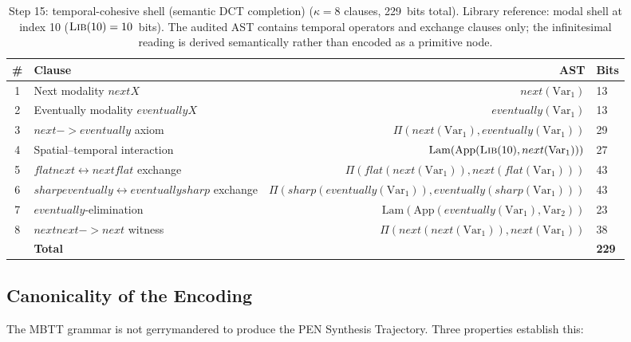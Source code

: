 \documentclass[11pt,a4paper]{article}
\def\to{->}%
\def\flat{flat}%
\def\sharp{sharp}%
\def\bigcirc{next}%
\def\Diamond{eventually}%
\theoremstyle{plain}
\theoremstyle{definition}
\theoremstyle{remark}
\begin{document}
\begin{table}[tbp]
\centering
\caption{Step 15: temporal-cohesive shell (semantic DCT completion) ($\kappa = 8$ clauses, 229~bits total).  Library reference: modal shell at index 10 ($\textsc{Lib}(10) = 10$~bits).  The audited AST contains temporal operators and exchange clauses only; the infinitesimal reading is derived semantically rather than encoded as a primitive node.}
\label{tab:step15}
\small
\begin{tabular}{@{}clrl@{}}
\toprule
\# & Clause & AST & Bits \\
\midrule
1 & Next modality $\bigcirc X$           & $\bigcirc(\mathrm{Var}_1)$ & 13 \\
2 & Eventually modality $\Diamond X$     & $\Diamond(\mathrm{Var}_1)$ & 13 \\
3 & $\bigcirc \to \Diamond$ axiom        & $\Pi(\bigcirc(\mathrm{Var}_1), \Diamond(\mathrm{Var}_1))$ & 29 \\
4 & Spatial--temporal interaction         & $\mathrm{Lam}(\mathrm{App}(\textsc{Lib}(10), \bigcirc(\mathrm{Var}_1)))$ & 27 \\
5 & $\flat\bigcirc \leftrightarrow \bigcirc\flat$ exchange & $\Pi(\flat(\bigcirc(\mathrm{Var}_1)), \bigcirc(\flat(\mathrm{Var}_1)))$ & 43 \\
6 & $\sharp\Diamond \leftrightarrow \Diamond\sharp$ exchange & $\Pi(\sharp(\Diamond(\mathrm{Var}_1)), \Diamond(\sharp(\mathrm{Var}_1)))$ & 43 \\
7 & $\Diamond$-elimination               & $\mathrm{Lam}(\mathrm{App}(\Diamond(\mathrm{Var}_1), \mathrm{Var}_2))$ & 23 \\
8 & $\bigcirc\bigcirc \to \bigcirc$ witness & $\Pi(\bigcirc(\bigcirc(\mathrm{Var}_1)), \bigcirc(\mathrm{Var}_1))$ & 38 \\
\midrule
  & \textbf{Total} & & \textbf{229} \\
\bottomrule
\end{tabular}
\end{table}

\subsection{Canonicality of the Encoding}

The MBTT grammar is not gerrymandered to produce the PEN Synthesis Trajectory.
Three properties establish this:
\end{document}
